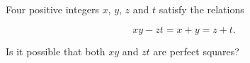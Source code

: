 Four positive integers $x$, $y$, $z$ and $t$ satisfy the relations

$$ xy - zt = x + y = z + t. $$

Is it possible that both $xy$ and $zt$ are perfect squares?